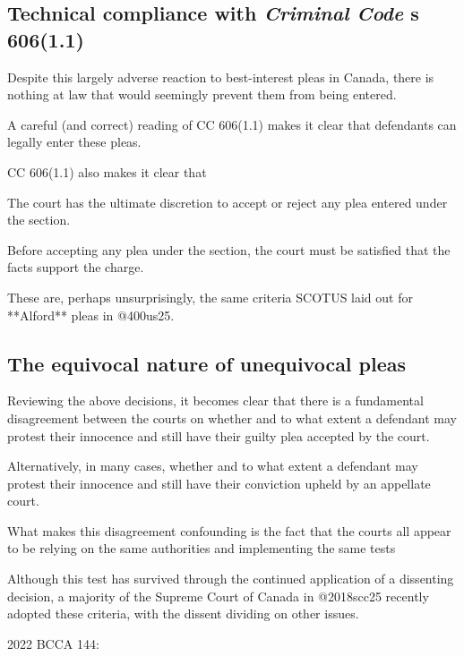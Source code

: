 \subsection{Technical compliance with \textit{Criminal Code} s 606(1.1)}

Despite this largely adverse reaction to best-interest pleas in Canada, there is nothing at law that would seemingly prevent them from being entered.

A careful (and correct) reading of CC 606(1.1) makes it clear that defendants can legally enter these pleas.

CC 606(1.1) also makes it clear that

The court has the ultimate discretion to accept or reject any plea entered under the section.

Before accepting any plea under the section, the court must be satisfied that the facts support the charge.

These are, perhaps unsurprisingly, the same criteria SCOTUS laid out for **Alford** pleas in @400us25.

\subsection{The equivocal nature of unequivocal pleas}



Reviewing the above decisions, it becomes clear that there is a fundamental disagreement between the courts on whether and to what extent a defendant may protest their innocence and still have their guilty plea accepted by the court.

Alternatively, in many cases, whether and to what extent a defendant may protest their innocence and still have their conviction upheld by an appellate court.

What makes this disagreement confounding is the fact that the courts all appear to be relying on the same authorities and implementing the same tests

Although this test has survived through the continued application of a dissenting decision, a majority of the Supreme Court of Canada in @2018scc25 recently adopted these criteria, with the dissent dividing on other issues.

2022 BCCA 144:

